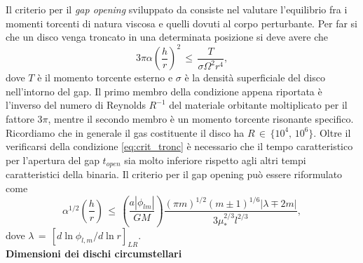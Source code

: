Il criterio per il \textit{gap opening} sviluppato da \textcite{ArtymowiczLubow1994} consiste nel valutare l'equilibrio fra i momenti torcenti di natura viscosa e quelli dovuti al corpo perturbante. Per far si che un disco venga troncato in una determinata posizione si deve avere che
\begin{equation}
3 \pi \alpha\left(\frac{h}{r}\right)^2\,\leq\,\frac{T}{\sigma \Omega^2 r^4},
\label{eq:crit_tronc}
\end{equation}
dove $T$ è il momento torcente esterno e $\sigma$ è la densità superficiale del disco nell'intorno del gap.
Il primo membro della condizione appena riportata è l'inverso del numero di Reynolds $R^{-1}$ del materiale orbitante moltiplicato per il fattore $3 \pi$, mentre il secondo membro è un momento torcente risonante specifico. Ricordiamo che in generale il gas costituente il disco ha $R\,\in\,\{10^{4},\,10^{6}\}$.
Oltre il verificarsi della condizione \eqref{eq:crit_tronc} è necessario che il tempo caratteristico per l'apertura del gap $t_{open}$ sia molto inferiore rispetto agli altri tempi caratteristici della binaria. Il criterio per il gap opening può essere riformulato \parencite{ArtymowiczLubow1994} come
\begin{equation}
\alpha^{1/2}\left(\frac{h}{r}\right)\,\leq\,\left(\frac{a|\phi_{lm}|}{GM}\right)\frac{(\pi m)^{1/2}(m\pm1)^{1/6}|\lambda\mp 2m|}{3\mu_\ast^{2/3}l^{2/3}},
\label{eq:crit_tronc1}
\end{equation}
dove $\lambda\,=\,[d\ln{\phi_{l,m}}/d\ln{r}]_{LR}$.\\

\textbf{Dimensioni dei dischi circumstellari}\\

